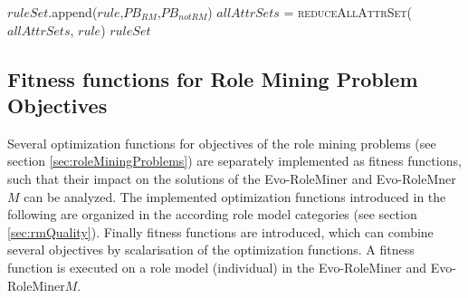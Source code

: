 \begin{algorithm}
\begin{algorithmic}[1]
                                            \EndIf
                                        \EndFor
                                        \fi
                                    \EndIf
                                \Else
                                    \State $ruleSet$.append($rule$,$PB_{RM}$,$PB_{notRM}$)
                                        \State $allAttrSets$ = \textsc{reduceAllAttrSet}($allAttrSets$, $rule$)
                                    \EndIf
                                \EndIf
                            \EndIf
                        \EndWhile 
                    \EndWhile
                    \State \Return $ruleSet$
                \EndProcedure
            \end{algorithmic}
        \end{algorithm}
        
    \subsection{Fitness functions for Role Mining Problem Objectives}
    \label{sec:optimizationFunctions}
    Several optimization functions for objectives of the role mining problems (see section \ref{sec:roleMiningProblems}) are separately implemented as fitness functions, such that their impact on the solutions of the Evo-RoleMiner and Evo-RoleMner$M$ can be analyzed. The implemented optimization functions introduced in the following are organized in the according role model categories (see section \ref{sec:rmQuality}). Finally fitness functions are introduced, which can combine several objectives by scalarisation of the optimization functions. A fitness function is executed on a role model (individual) in the Evo-RoleMiner and Evo-RoleMiner$M$.
